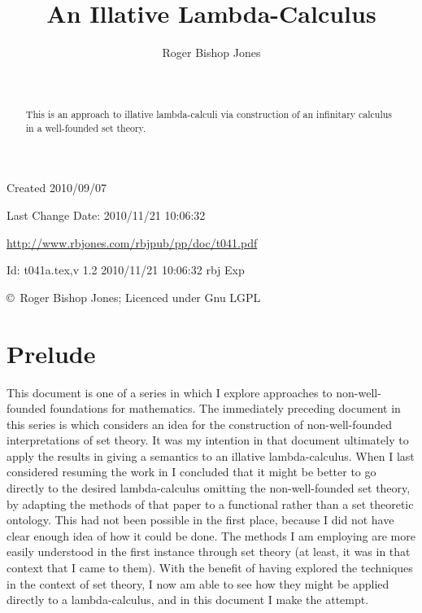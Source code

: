 \documentclass[11pt]{article}
\title{An Illative Lambda-Calculus}
\author{Roger Bishop Jones}
\date{\ }
\begin{document}
\begin{titlepage}
\maketitle
\begin{abstract}
This is an approach to illative lambda-calculi via construction of an infinitary calculus in a well-founded set theory.
\end{abstract}
\vfill

\begin{centering}
{\footnotesize

Created 2010/09/07

Last Change $ $Date: 2010/11/21 10:06:32 $ $

\href{http://www.rbjones.com/rbjpub/pp/doc/t041.pdf}
{http://www.rbjones.com/rbjpub/pp/doc/t041.pdf}

$ $Id: t041a.tex,v 1.2 2010/11/21 10:06:32 rbj Exp $ $

\copyright\ Roger Bishop Jones; Licenced under Gnu LGPL

}%
\end{centering}

\thispagestyle{empty}
\end{titlepage}

\newpage
\addtocounter{page}{1}
{\parskip=0pt\tableofcontents}

\section{Prelude}

This document is one of a series in which I explore approaches to non-well-founded foundations for mathematics.
The immediately preceding document in this series is \cite{rbjt027} which considers an idea for the construction of non-well-founded interpretations of set theory.
It was my intention in that document ultimately to apply the results in giving a semantics to an illative lambda-calculus.
When I last considered resuming the work in \cite{rbjt027} I concluded that it might be better to go directly to the desired lambda-calculus omitting the non-well-founded set theory, by adapting the methods of that paper to a functional rather than a set theoretic ontology.
This had not been possible in the first place, because I did not have clear enough idea of how it could be done.
The methods I am employing are more easily understood in the first instance through set theory (at least, it was in that context that I came to them).
With the benefit of having explored the techniques in the context of set theory, I now am able to see how they might be applied directly to a lambda-calculus, and in this document I make the attempt.
\end{document}
